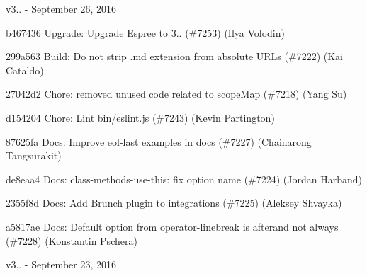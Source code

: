 v3.. -\/ September 26, 2016


\begin{DoxyItemize}
\item b467436 Upgrade\+: Upgrade Espree to 3.. (\#7253) (Ilya Volodin)
\item 299a563 Build\+: Do not strip .md extension from absolute U\+R\+Ls (\#7222) (Kai Cataldo)
\item 27042d2 Chore\+: removed unused code related to scope\+Map (\#7218) (Yang Su)
\item d154204 Chore\+: Lint bin/eslint.\+js (\#7243) (Kevin Partington)
\item 87625fa Docs\+: Improve eol-\/last examples in docs (\#7227) (Chainarong Tangsurakit)
\item de8eaa4 Docs\+: {\ttfamily class-\/methods-\/use-\/this}\+: fix option name (\#7224) (Jordan Harband)
\item 2355f8d Docs\+: Add Brunch plugin to integrations (\#7225) (Aleksey Shvayka)
\item a5817ae Docs\+: Default option from {\ttfamily operator-\/linebreak} is {\ttfamily after}and not always (\#7228) (Konstantin Pschera)
\end{DoxyItemize}

v3.. -\/ September 23, 2016



